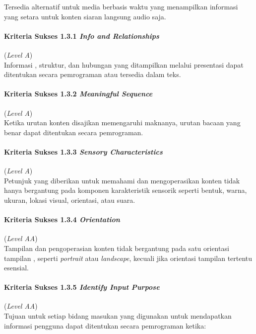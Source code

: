 Tersedia alternatif untuk media berbasis waktu yang menampilkan informasi yang setara untuk konten siaran langsung audio saja.


\paragraph{Kriteria Sukses 1.3.1 \textit{Info and Relationships}}
\label{subsec:kriteria_1.3.1}
(\textit{Level A}) \\

Informasi , struktur, dan hubungan yang ditampilkan melalui presentasi dapat ditentukan secara pemrograman atau tersedia dalam teks.


\paragraph{Kriteria Sukses 1.3.2 \textit{Meaningful Sequence}}
\label{subsec:kriteria_1.3.2}
(\textit{Level A}) \\

Ketika urutan konten disajikan memengaruhi maknanya, urutan bacaan yang benar dapat ditentukan secara pemrograman.


\paragraph{Kriteria Sukses 1.3.3 \textit{Sensory Characteristics}}
\label{subsec:kriteria_1.3.3}
(\textit{Level A}) \\

Petunjuk yang diberikan untuk memahami dan mengoperasikan konten tidak hanya bergantung pada komponen karakteristik sensorik seperti bentuk, warna, ukuran, lokasi visual, orientasi, atau suara.


\paragraph{Kriteria Sukses 1.3.4 \textit{Orientation}}
\label{subsec:kriteria_1.3.4}
(\textit{Level AA}) \\

Tampilan dan pengoperasian konten tidak bergantung pada satu orientasi tampilan , seperti \textit{portrait} atau \textit{landscape}, kecuali jika orientasi tampilan tertentu esensial.


\paragraph{Kriteria Sukses 1.3.5 \textit{Identify Input Purpose}}
\label{subsec:kriteria_1.3.5}
(\textit{Level AA}) \\
Tujuan untuk setiap bidang masukan yang digunakan untuk mendapatkan informasi pengguna dapat ditentukan secara pemrograman ketika:

